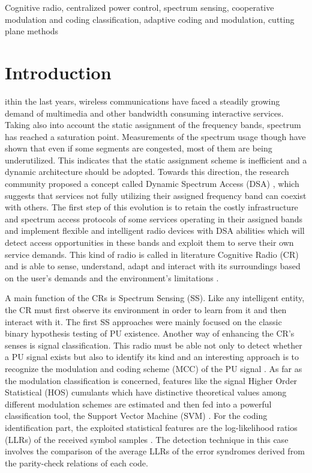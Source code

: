 \documentclass[journal]{IEEEtran}
\begin{document}
\begin{IEEEkeywords}

Cognitive radio, centralized power control, spectrum sensing, cooperative modulation and coding classification, adaptive coding and modulation, cutting plane methods

\end{IEEEkeywords}

\IEEEpeerreviewmaketitle

\section{Introduction}

ithin the last years, wireless communications have faced a steadily growing demand of multimedia and other bandwidth consuming interactive services. Taking also into account the static assignment of the frequency bands, spectrum has reached a saturation point. Measurements of the spectrum usage though have shown that even if some segments are congested, most of them are being underutilized. This indicates that the static assignment scheme is inefficient and a dynamic architecture should be adopted. Towards this direction, the research community proposed a concept called Dynamic Spectrum Access (DSA) \cite{biban36}, which suggests that services not fully utilizing their assigned frequency band can coexist with others. The first step of this evolution is to retain the costly infrastructure and spectrum access protocols of some services operating in their assigned bands and implement flexible and intelligent radio devices with DSA abilities which will detect access opportunities in these bands and exploit them to serve their own service demands. This kind of radio is called in literature Cognitive Radio (CR) and is able to sense, understand, adapt and interact with its surroundings based on the user's demands and the environment's limitations \cite{biban21}.

A main function of the CRs is Spectrum Sensing (SS). Like any intelligent entity, the CR must first observe its environment in order to learn from it and then interact with it. The first SS approaches were mainly focused on the classic binary hypothesis testing of PU existence. Another way of enhancing the CR's senses is signal classification. This radio must be able not only to detect whether a PU signal exists but also to identify its kind and an interesting approach is to recognize the modulation and coding scheme (MCC) of the PU signal \cite{biban57, biban71}. As far as the modulation classification is concerned, features like the signal Higher Order Statistical (HOS) cumulants which have distinctive theoretical values among different modulation schemes \cite{biban25} are estimated and then fed into a powerful classification tool, the Support Vector Machine (SVM) \cite{biban29}. For the coding identification part, the exploited statistical features are the log-likelihood ratios (LLRs) of the received symbol samples \cite{biban38, biban39}. The detection technique in this case involves the comparison of the average LLRs of the error syndromes derived from the parity-check relations of each code.
\end{document}
